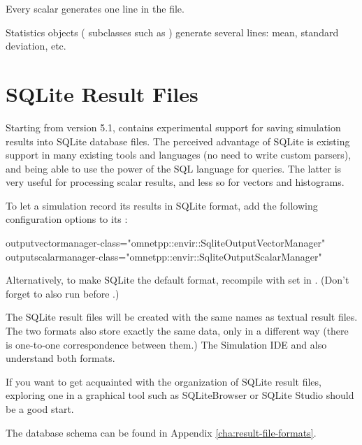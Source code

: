 Every scalar generates one  line in the file.

Statistics objects ( subclasses such as )
generate several lines: mean, standard deviation, etc.



\section{SQLite Result Files}
\label{sec:ana-sim:sqlite-result-files}

Starting from version 5.1, {\opp} contains experimental support for
saving simulation results into SQLite database files. The perceived advantage
of SQLite is existing support in many existing tools and languages (no need to
write custom parsers), and being able to use the power of the SQL language
for queries. The latter is very useful for processing scalar results, and less
so for vectors and histograms.

To let a simulation record its results in SQLite format, add the following
configuration options to its :

\begin{inifile}
outputvectormanager-class="omnetpp::envir::SqliteOutputVectorManager"
outputscalarmanager-class="omnetpp::envir::SqliteOutputScalarManager"
\end{inifile}

\begin{note}
Alternatively, to make SQLite the default format, recompile {\opp} with
 set in .
(Don't forget to also run   before .)
\end{note}

The SQLite result files will be created with the same names as textual
result files. The two formats also store exactly the same data, only in
a different way (there is one-to-one correspondence between them.) The
Simulation IDE and  also understand both formats.

\begin{hint}
If you want to get acquainted with the organization of SQLite result
files, exploring one in a graphical tool such as SQLiteBrowser or SQLite
Studio should be a good start.
\end{hint}

The database schema can be found in Appendix \ref{cha:result-file-formats}.

